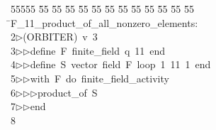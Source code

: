 %
%
\begin{tabbing}
55555 \= 55 \= 55 \= 55 \= 55 \= 55 \= 55 \= 55 \= 55 \= 55 \= 55 \= 55 \= 55 \= \>F\_11\_product\_of\_all\_nonzero\_elements:\\[0pt]
2\>$\triangleright$\>(ORBITER)\ v\ 3\ \\[0pt]
3\>$\triangleright$\>$\triangleright$\>define\ F\ finite\_field\ q\ 11\ end\ \\[0pt]
4\>$\triangleright$\>$\triangleright$\>define\ S\ vector\ field\ F\ loop\ 1\ 11\ 1\ end\ \\[0pt]
5\>$\triangleright$\>$\triangleright$\>with\ F\ do\ finite\_field\_activity\ \\[0pt]
6\>$\triangleright$\>$\triangleright$\>$\triangleright$\>product\_of\ S\ \\[0pt]
7\>$\triangleright$\>$\triangleright$\>end\\[0pt]
8\>\end{tabbing}

